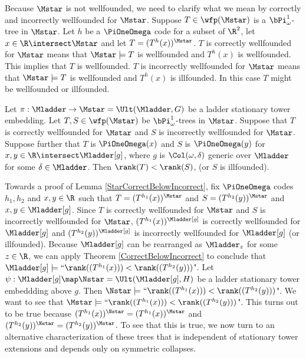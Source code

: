 \documentclass[oneside,12pt]{amsart}
\begin{document}
Because $\Mstar$ is not wellfounded, we need to clarify what we mean by correctly and incorrectly wellfounded
for $\Mstar$. Suppose $T\in\wfp(\Mstar)$ is a $\bPi^1_{\omega}$-tree in $\Mstar$. Let $h$ be a $\PiOneOmega$ code for
a subset of $\R^2$, let $x\in\R\intersect\Mstar$ and let $T=(T^h(x))^{\Mstar}$. $T$ is correctly wellfounded
for $\Mstar$ means that $\Mstar\models T$ is wellfounded and $T^h(x)$ is wellfounded. This implies that
$T$ is wellfounded. $T$ is incorrectly wellfounded for $\Mstar$ means that
$\Mstar\models T$ is wellfounded and $T^h(x)$ is illfounded. In this case $T$ might be wellfounded or illfounded.

\begin{lemma}
\label{StarCorrectBelowIncorrect}
Let $\pi:\Mladder\to\Mstar=\Ult(\Mladder,G)$ be a ladder stationary tower embedding.
Let $T,S\in\wfp(\Mstar)$ be $\bPi^1_{\omega}$-trees in $\Mstar$.
Suppose that $T$ is correctly wellfounded for $\Mstar$ and
$S$ is incorrectly wellfounded for $\Mstar$. Suppose further that $T$ is $\PiOneOmega(x)$
and $S$ is $\PiOneOmega(y)$ for $x,y\in\R\intersect\Mladder[g]$,
where $g$ is $\Col(\omega,\delta)$ generic over $\Mladder$ for some $\delta\in\Mladder$.
Then $\rank(T) < \rank(S)$, (or $S$ is illfounded).
\end{lemma}

Towards a proof of Lemma \ref{StarCorrectBelowIncorrect},
fix $\PiOneOmega$ codes $h_1, h_2$ and $x,y\in\R$ such that $T=(T^{h_1}(x))^{\Mstar}$ and
$S=(T^{h_2}(y))^{\Mstar}$ and $x,y\in\Mladder[g]$. Since $T$ is correctly wellfounded
for $\Mstar$ and $S$ is incorrectly wellfounded for $\Mstar$, $(T^{h_1}(x))^{\Mladder[g]}$
is correctly wellfounded for $\Mladder[g]$ and
$(T^{h_2}(y))^{\Mladder[g]}$
is incorrectly wellfounded for $\Mladder[g]$ (or illfounded).
Because $\Mladder[g]$ can be rearranged as $\Mladder_z$ for some $z\in\R$,
we can apply Theorem \ref{CorrectBelowIncorrect} to conclude that
$\Mladder[g]\models \text{``}\rank((T^{h_1}(x))) < \rank((T^{h_2}(y)))$".
Let $\psi:\Mladder[g]\map\Nstar=\Ult(\Mladder[g],H)$ be a ladder stationary tower embeddding
above $g$. Then $\Nstar\models \text{``}\rank((T^{h_1}(x))) < \rank((T^{h_2}(y)))$".
We want to see that $\Mstar\models \text{``}\rank((T^{h_1}(x))) < \rank((T^{h_2}(y)))$".
This turns out to be true because $(T^{h_1}(x))^{\Nstar}=(T^{h_1}(x))^{\Mstar}$
and $(T^{h_2}(y))^{\Nstar}=(T^{h_2}(y))^{\Mstar}$. To see that this is true, we
now turn to an alternative characterization of these trees that is independent
of stationary tower extensions and depends only on symmetric collapses.
\end{document}
